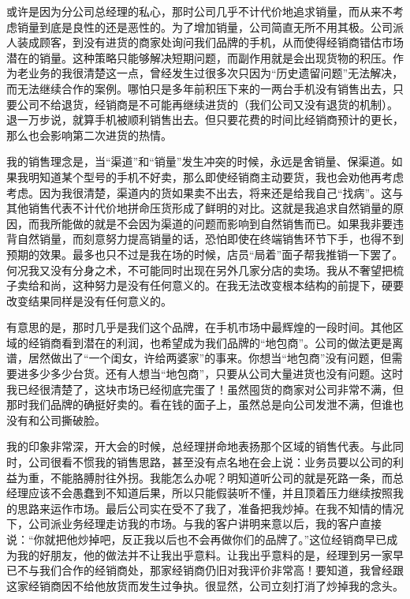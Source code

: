 或许是因为分公司总经理的私心，那时公司几乎不计代价地追求销量，而从来不考虑销量到底是良性的还是恶性的。为了增加销量，公司简直无所不用其极。公司派人装成顾客，到没有进货的商家处询问我们品牌的手机，从而使得经销商错估市场潜在的销量。这种策略只能够解决短期问题，而副作用就是会出现货物的积压。作为老业务的我很清楚这一点，曾经发生过很多次只因为“历史遗留问题”无法解决，而无法继续合作的案例。哪怕只是多年前积压下来的一两台手机没有销售出去，只要公司不给退货，经销商是不可能再继续进货的（我们公司又没有退货的机制）。退一万步说，就算手机被顺利销售出去。但只要花费的时间比经销商预计的更长，那么也会影响第二次进货的热情。

我的销售理念是，当“渠道”和“销量”发生冲突的时候，永远是舍销量、保渠道。如果我明知道某个型号的手机不好卖，那么即使经销商主动要货，我也会劝他再考虑考虑。因为我很清楚，渠道内的货如果卖不出去，将来还是给我自己“找病”。这与其他销售代表不计代价地拼命压货形成了鲜明的对比。这就是我追求自然销量的原因，而我所能做的就是不会因为渠道的问题而影响到自然销售而已。如果我非要违背自然销量，而刻意努力提高销量的话，恐怕即使在终端销售环节下手，也得不到预期的效果。最多也只不过是我在场的时候，店员“局着”面子帮我推销一下罢了。何况我又没有分身之术，不可能同时出现在另外几家分店的卖场。我从不奢望把梳子卖给和尚，这种努力是没有任何意义的。在我无法改变根本结构的前提下，硬要改变结果同样是没有任何意义的。

有意思的是，那时几乎是我们这个品牌，在手机市场中最辉煌的一段时间。其他区域的经销商看到潜在的利润，也希望成为我们品牌的“地包商”。公司的做法更是离谱，居然做出了“一个闺女，许给两婆家”的事来。你想当“地包商”没有问题，但需要进多少多少台货。还有人想当“地包商”，只要从公司大量进货也没有问题。这时我已经很清楚了，这块市场已经彻底完蛋了！虽然囤货的商家对公司非常不满，但那时我们品牌的确挺好卖的。看在钱的面子上，虽然总是向公司发泄不满，但谁也没有和公司撕破脸。

我的印象非常深，开大会的时候，总经理拼命地表扬那个区域的销售代表。与此同时，公司很看不惯我的销售思路，甚至没有点名地在会上说：业务员要以公司的利益为重，不能胳膊肘往外拐。我能怎么办呢？明知道听公司的就是死路一条，而总经理应该不会愚蠢到不知道后果，所以只能假装听不懂，并且顶着压力继续按照我的思路来运作市场。最后公司实在受不了我了，准备把我炒掉。在我不知情的情况下，公司派业务经理走访我的市场。与我的客户讲明来意以后，我的客户直接说：“你就把他炒掉吧，反正我以后也不会再做你们的品牌了。”这位经销商早已成为我的好朋友，他的做法并不让我出乎意料。让我出乎意料的是，经理到另一家早已不与我们合作的经销商处，那家经销商仍旧对我评价非常高！要知道，我曾经跟这家经销商因不给他放货而发生过争执。很显然，公司立刻打消了炒掉我的念头。

